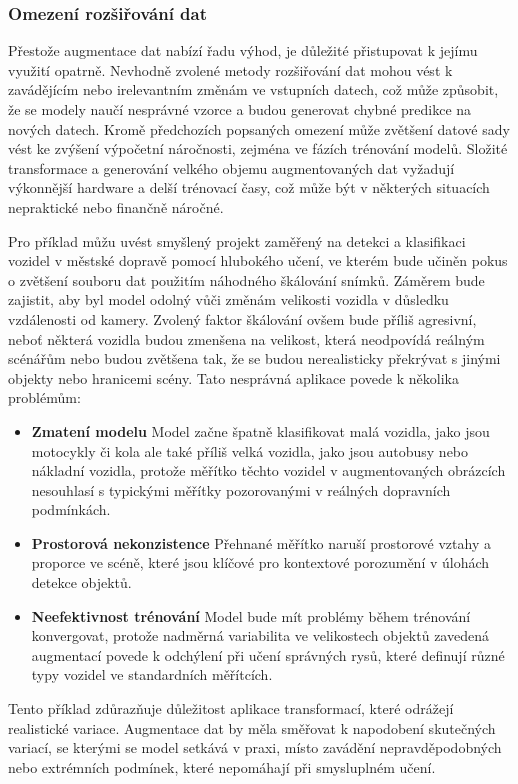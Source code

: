 \documentclass[male,czech,api_ing]{thesis}
\begin{document}
\subsubsection{Omezení rozšiřování dat}
Přestože augmentace dat nabízí řadu výhod, je důležité přistupovat k jejímu využití opatrně. Nevhodně zvolené metody rozšiřování dat mohou vést k zavádějícím nebo irelevantním změnám ve vstupních datech, což může způsobit, že se modely naučí nesprávné vzorce a budou generovat chybné predikce na nových datech. Kromě předchozích popsaných omezení může zvětšení datové sady vést ke zvýšení výpočetní náročnosti, zejména ve fázích trénování modelů. Složité transformace a generování velkého objemu augmentovaných dat vyžadují výkonnější hardware a delší trénovací časy, což může být v některých situacích nepraktické nebo finančně náročné.

Pro příklad můžu uvést smyšlený projekt zaměřený na detekci a klasifikaci vozidel v městské dopravě pomocí hlubokého učení, ve kterém bude učiněn pokus o zvětšení souboru dat použitím náhodného škálování snímků. Záměrem bude zajistit, aby byl model odolný vůči změnám velikosti vozidla v důsledku vzdálenosti od kamery. Zvolený faktor škálování ovšem bude příliš agresivní, neboť některá vozidla budou zmenšena na velikost, která neodpovídá reálným scénářům nebo budou zvětšena tak, že se budou nerealisticky překrývat s jinými objekty nebo hranicemi scény. Tato nesprávná aplikace povede k několika problémům:

\begin{itemize}
    \item \textbf{Zmatení modelu} Model začne špatně klasifikovat malá vozidla, jako jsou motocykly či kola ale také příliš velká vozidla, jako jsou autobusy nebo nákladní vozidla, protože měřítko těchto vozidel v augmentovaných obrázcích nesouhlasí s typickými měřítky pozorovanými v reálných dopravních podmínkách. 
    \item \textbf{Prostorová nekonzistence} Přehnané měřítko naruší prostorové vztahy a proporce ve scéně, které jsou klíčové pro kontextové porozumění v úlohách detekce objektů.
    \item \textbf{Neefektivnost trénování} Model bude mít problémy během trénování konvergovat, protože nadměrná variabilita ve velikostech objektů zavedená augmentací povede k odchýlení při učení správných rysů, které definují různé typy vozidel ve standardních měřítcích. 
\end{itemize}

Tento příklad zdůrazňuje důležitost aplikace transformací, které odrážejí realistické variace. Augmentace dat by měla směřovat k napodobení skutečných variací, se kterými se model setkává v praxi, místo zavádění nepravděpodobných nebo extrémních podmínek, které nepomáhají při smysluplném učení. \cite{AugmentationBasics, AugmentationSurvey}
\end{document}
